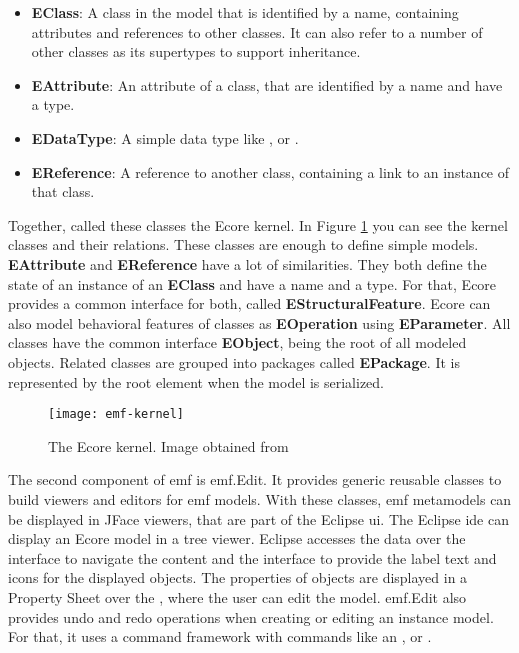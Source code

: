     \begin{itemize}
      \item \textbf{EClass}: A class in the model that is identified by a name, containing attributes and references to other classes. It can also refer to a number of other classes as its supertypes to support inheritance. \cite{emf}
      \item \textbf{EAttribute}: An attribute of a class, that are identified by a name and have a type. \cite{emf}
      \item \textbf{EDataType}: A simple data type like ,  or . \cite{emf}
      \item \textbf{EReference}: A reference to another class, containing a link to an instance of that class. \cite{emf}
    \end{itemize}


    Together, \citeauthor{emf} called these classes the Ecore kernel. In Figure \ref{fig:emf-kernel} you can see the kernel classes and their relations. These classes are enough to define simple models. \textbf{EAttribute} and \textbf{EReference} have a lot of similarities. They both define the state of an instance of an \textbf{EClass} and have a name and a type. For that, Ecore provides a common interface for both, called \textbf{EStructuralFeature}. Ecore can also model behavioral features of classes as \textbf{EOperation} using \textbf{EParameter}. All classes have the common interface \textbf{EObject}, being the root of all modeled objects. Related classes are grouped into packages called \textbf{EPackage}. It is represented by the root element when the model is serialized. \cite{emf}

    \begin{figure}[h]
      \centering
      \texttt{[image: emf-kernel]}
      \caption{The Ecore kernel. Image obtained from \cite{emf}}
      \label{fig:emf-kernel}
    \end{figure}

    The second component of \ac{emf} is \ac{emf}.Edit. It provides generic reusable classes to build viewers and editors for \ac{emf} models. With these classes, \ac{emf} metamodels can be displayed in JFace viewers, that are part of the Eclipse \acs{ui}. \cite{eclipse_emf} The Eclipse \ac{ide} can display an Ecore model in a tree viewer. Eclipse accesses the data over the  interface to navigate the content and the  interface to provide the label text and icons for the displayed objects. The properties of objects are displayed in a Property Sheet over the , where the user can edit the model. \ac{emf}.Edit also provides undo and redo operations when creating or editing an instance model. For that, it uses a command framework with commands like an ,  or . \cite{emf}

